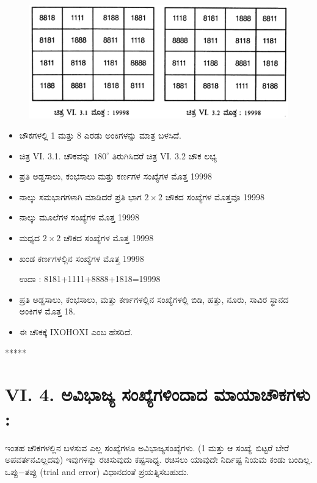 \begin{figure}[H]
\includegraphics[scale=.9]{src/figures/chap5/fig5-3.jpg}
\end{figure}
\begin{itemize}
	\item ಚೌಕಗಳಲ್ಲಿ 1 ಮತ್ತು 8 ಎರಡು ಅಂಕಿಗಳನ್ನು ಮಾತ್ರ ಬಳಸಿದೆ.
	\item ಚಿತ್ರ VI. 3.1. ಚೌಕವನ್ನು $180^\circ$ ತಿರುಗಿಸಿದರೆ ಚಿತ್ರ VI. 3.2 ಚೌಕ ಲಭ್ಯ
	\item ಪ್ರತಿ ಅಡ್ಡಸಾಲು, ಕಂಭಸಾಲು ಮತ್ತು ಕರ್ಣಗಳ ಸಂಖ್ಯೆಗಳ ಮೊತ್ತ 19998
	\item ನಾಲ್ಕು ಸಮಭಾಗಗಳಾಗಿ ಮಾಡಿದರೆ ಪ್ರತಿ ಭಾಗ $2 \times 2$ ಚೌಕದ ಸಂಖ್ಯೆಗಳ ಮೊತ್ತವೂ 19998
	\item ನಾಲ್ಕು ಮೂಲೆಗಳ ಸಂಖ್ಯೆಗಳ ಮೊತ್ತ 19998
	\item ಮಧ್ಯದ $2 \times 2$ ಚೌಕದ ಸಂಖ್ಯೆಗಳ ಮೊತ್ತ 19998
	\item ಖಂಡ ಕರ್ಣಗಳಲ್ಲಿನ ಸಂಖ್ಯೆಗಳ ಮೊತ್ತ 19998

	ಉದಾ : 8181+1111+8888+1818=19998
	\item ಪ್ರತಿ ಅಡ್ಡಸಾಲು, ಕಂಭಸಾಲು, ಮತ್ತು ಕರ್ಣಗಳಲ್ಲಿನ ಸಂಖ್ಯೆಗಳಲ್ಲಿ ಬಿಡಿ, ಹತ್ತು, \linebreak ನೂರು, ಸಾವಿರ ಸ್ಥಾನದ ಅಂಕಿಗಳ ಮೊತ್ತ 18.
	\item ಈ ಚೌಕಕ್ಕೆ IXOHOXI ಎಂಬ ಹೆಸರಿದೆ.
\end{itemize}
\begin{center}
*****
\end{center}

\section*{VI. 4. ಅವಿಭಾಜ್ಯ ಸಂಖ್ಯೆಗಳಿಂದಾದ ಮಾಯಾಚೌಕಗಳು :}

ಇಂತಹ ಚೌಕಗಳಲ್ಲಿನ ಬಳಸುವ ಎಲ್ಲ ಸಂಖ್ಯೆಗಳೂ ಅವಿಭಾಜ್ಯಸಂಖ್ಯೆಗಳು. (1 ಮತ್ತು ಆ \hbox{ಸಂಖ್ಯೆ ಬಿಟ್ಟರೆ} ಬೇರೆ ಅಪವರ್ತನವಿಲ್ಲದವು) ಇವುಗಳನ್ನು ರಚಿಸುವುದು ಕಷ್ಟಸಾಧ್ಯ. ರಚಿಸಲು ಯಾವುದೇ ನಿರ್ದಿಷ್ಟ ನಿಯಮ ಕಂಡು ಬಂದಿಲ್ಲ. ಒಪ್ಪು$-$ತಪ್ಪು (trial and error) ವಿಧಾನ\break ದಂತೆ ಪ್ರಯತ್ನಿಸಬಹುದು.

